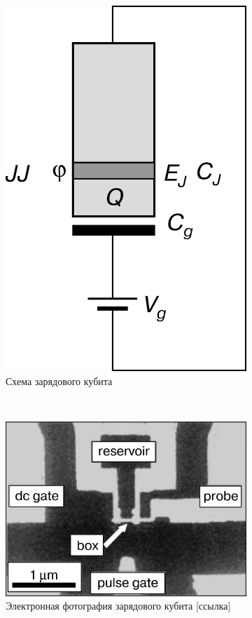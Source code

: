 \documentclass[12pt, twoside]{report}
\numberwithin{equation}{section}
\numberwithin{figure}{section}
\begin{document}
\begin{figure}[!h]
\begingroup
\captionsetup[subfigure]{width=0.9\textwidth, justification=normal}
\centering
\begin{subfigure}[t]{0.49\linewidth}
\centering
\includegraphics[height = .6\textwidth]{Pictures2/charge_qubit_scheme}
\caption{Схема зарядового кубита}
\label{fig:charge-scheme}
\end{subfigure}~
\begin{subfigure}[t]{0.49\linewidth}
\centering
\includegraphics[height = .6\textwidth]{Pictures2/charge_qubit_photo}
\caption{Электронная фотография зарядового кубита [ссылка]}
\label{fig:charge-photo}
\end{subfigure}

\endgroup
\caption{}
\end{figure}
\end{document}
